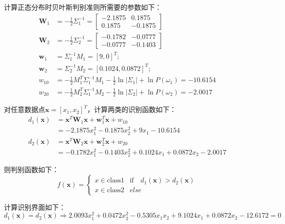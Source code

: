 \documentclass[cn]{elegantbook}
\begin{document}
计算正态分布时贝叶斯判别准则所需要的参数如下：
\begin{equation}
\begin{aligned}
\mathbf{W}_1&=-\frac{1}{2}\Sigma_1^{-1}=\left[\begin{array}{cc}
-2.1875 & 0.1875 \\
0.1875 & -0.1875
\end{array}\right] \\
\mathbf{W}_2&=-\frac{1}{2}\Sigma_2^{-1}=\left[\begin{array}{cc}
-0.1782 & -0.0777 \\
-0.0777 & -0.1403
\end{array}\right] \\
\mathbf{w}_1&=\Sigma_1^{-1}M_1=[9,0]^T; \\
\mathbf{w}_2&=\Sigma_2^{-1}M_2=[0.1024,0.0872]^T; \\
w_{10}&=-\frac{1}{2}M_1^T\Sigma_1^{-1}M_1-\frac{1}{2}\ln |\Sigma_1|+\ln P(\omega_1)=-10.6154 \\
w_{20}&=-\frac{1}{2}M_2^T\Sigma_1^{-1}M_2-\frac{1}{2}\ln |\Sigma_2|+\ln P(\omega_2)=-2.0017
\end{aligned}
\end{equation}

对任意数据点$\mathbf{x}=[x_1,x_2]^T$，计算两类的识别函数如下：
\begin{equation}
\begin{aligned}
d_1(\mathbf{x})&=\mathbf{x}^T\mathbf{W}_1\mathbf{x}+\mathbf{w}_1^T\mathbf{x}+w_{10} \\
&=-2.1875x_1^2-0.1875x_2^2+9x_1-10.6154 \\
d_2(\mathbf{x})&=\mathbf{x}^T\mathbf{W}_2\mathbf{x}+\mathbf{w}_2^T\mathbf{x}+w_{20} \\
&=-0.1782x_1^2-0.1403x_2^2+0.1024x_1+0.0872x_2-2.0017
\end{aligned}
\end{equation}

则判别函数如下：
\begin{equation}
f(\mathbf{x})=\left\{\begin{array}{cc}
x\in\mbox{class1} & \mbox{if}\quad d_1(\mathbf{x})>d_2(\mathbf{x}) \\
x\in\mbox{class2} & else
\end{array}\right.
\end{equation}

计算识别界面如下：
\begin{equation}
d_1(\mathbf{x})=d_2(\mathbf{x})\Rightarrow 2.0093x_1^2+0.0472x_2^2-0.5305x_1x_2+9.1024x_1+0.0872x_2-12.6172=0
\end{equation}
\end{document}
